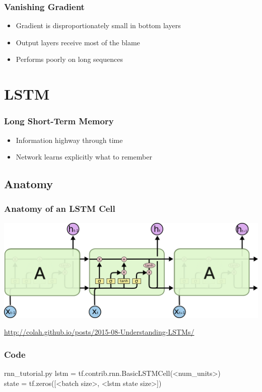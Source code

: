 \documentclass[pdf]{beamer}
\newenvironment{code}{\ttfamily\scriptsize\begin{block}}{\end{block}}
\begin{document}
\begin{frame}
  \frametitle{Vanishing Gradient}
  \begin{itemize}
  \item Gradient is disproportionately small in bottom layers
  \item Output layers receive most of the blame
  \item Performs poorly on long sequences
  \end{itemize}
\end{frame}

\section{LSTM}

\begin{frame}
  \frametitle{Long Short-Term Memory}
  \begin{itemize}
  \item Information highway through time
  \item Network learns explicitly what to remember
  \end{itemize}
\end{frame}
\subsection{Anatomy}
\begin{frame}[t]
  \frametitle{Anatomy of an LSTM Cell}
  \begin{center}
    \includegraphics[scale=0.4]{LSTM3-chain.png}
  \end{center}
  \footnotesize  \url{http://colah.github.io/posts/2015-08-Understanding-LSTMs/}
\end{frame}

\begin{frame}
  \frametitle{Code}
  \begin{code}{rnn\_tutorial.py}
    lstm = tf.contrib.rnn.BasicLSTMCell(<num\_units>)\\
    state = tf.zeros([<batch size>, <lstm state size>])
  \end{code}
\end{frame}
\end{document}
